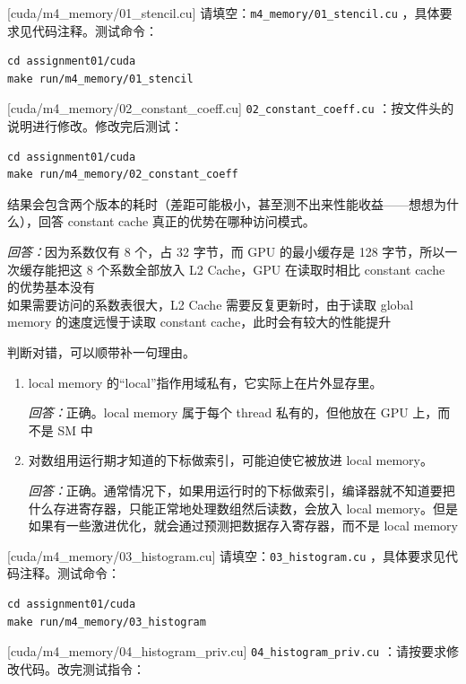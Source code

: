 \documentclass[11pt,a4paper,fontset=none]{ctexart}
\begin{document}
[cuda/m4\_memory/01\_stencil.cu]
请填空：\texttt{m4\_memory/01\_stencil.cu} ，具体要求见代码注释。测试命令：

\begin{lstlisting}
cd assignment01/cuda
make run/m4_memory/01_stencil
\end{lstlisting}

[cuda/m4\_memory/02\_constant\_coeff.cu]
\texttt{02\_constant\_coeff.cu} ：按文件头的说明进行修改。修改完后测试：

\begin{lstlisting}
cd assignment01/cuda
make run/m4_memory/02_constant_coeff
\end{lstlisting}

结果会包含两个版本的耗时（差距可能极小，甚至测不出来性能收益——想想为什么），回答 constant cache 真正的优势在哪种访问模式。
\par\noindent\textit{回答：}因为系数仅有 8 个，占 32 字节，而 GPU 的最小缓存是 128 字节，所以一次缓存能把这 8 个系数全部放入 L2 Cache，GPU 在读取时相比 constant cache 的优势基本没有\\
如果需要访问的系数表很大，L2 Cache 需要反复更新时，由于读取 global memory 的速度远慢于读取 constant cache，此时会有较大的性能提升


判断对错，可以顺带补一句理由。
\begin{enumerate}[label=(\alph*)]
  \item local memory 的“local”指作用域私有，它实际上在片外显存里。
  \par\noindent\textit{回答：}正确。local memory 属于每个 thread 私有的，但他放在 GPU 上，而不是 SM 中
  \item 对数组用运行期才知道的下标做索引，可能迫使它被放进 local memory。
  \par\noindent\textit{回答：}正确。通常情况下，如果用运行时的下标做索引，编译器就不知道要把什么存进寄存器，只能正常地处理数组然后读数，会放入 local memory。但是如果有一些激进优化，就会通过预测把数据存入寄存器，而不是 local memory
\end{enumerate}

[cuda/m4\_memory/03\_histogram.cu]
请填空：\texttt{03\_histogram.cu} ，具体要求见代码注释。测试命令：

\begin{lstlisting}
cd assignment01/cuda
make run/m4_memory/03_histogram
\end{lstlisting}

[cuda/m4\_memory/04\_histogram\_priv.cu]
\texttt{04\_histogram\_priv.cu} ：请按要求修改代码。改完测试指令：
\end{document}
